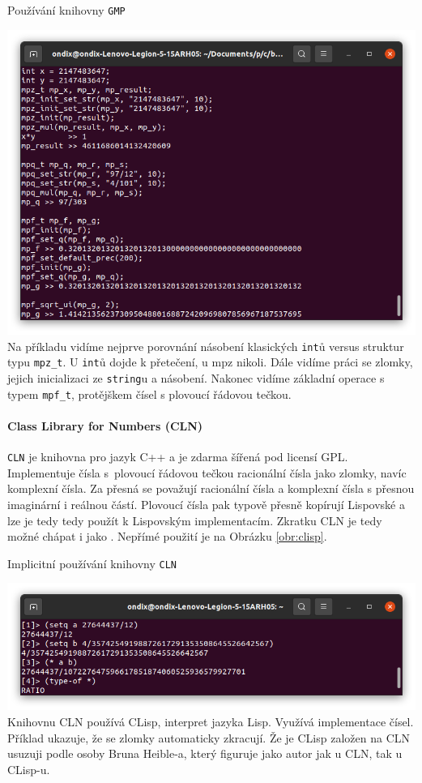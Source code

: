 \begin{myfigure}{}
\caption{Používání knihovny \texttt{GMP}}
\includegraphics[width=\linewidth]{./graphics/gmp.png}\label{obr:gmp}
Na příkladu vidíme nejprve porovnání násobení klasických \texttt{int}ů versus struktur typu \texttt{mpz\_t}. U \texttt{int}ů dojde k přetečení, u mpz nikoli. Dále vidíme práci se zlomky, jejich inicializaci ze \texttt{string}u a násobení. Nakonec vidíme základní operace s typem \texttt{mpf\_t}, protějškem čísel s plovoucí řádovou tečkou.
\end{myfigure}

\paragraph{Class Library for Numbers \cite{wiki:CLN} (CLN)} \texttt{CLN} je knihovna pro jazyk C++ a je zdarma šířená pod licensí GPL. Implementuje čísla s~plovoucí řádovou tečkou racionální čísla jako zlomky, navíc komplexní čísla. Za přesná se považují racionální čísla a komplexní čísla s přesnou imaginární i reálnou částí. Plovoucí čísla pak typově přesně kopírují Lispovské a lze je tedy tedy použít k Lispovským implementacím. Zkratku CLN je tedy možné chápat i jako . Nepřímé použití je na Obrázku \ref{obr:clisp}.
	
\begin{myfigure}{}
\caption{Implicitní používání knihovny \texttt{CLN}}
\includegraphics[width=\linewidth]{./graphics/clisp.png}\label{obr:clisp}
Knihovnu CLN používá CLisp, interpret jazyka Lisp. Využívá implementace čísel. Příklad ukazuje, že se zlomky automaticky zkracují. Že je CLisp založen na CLN usuzuji podle osoby Bruna Heible-a, který figuruje jako autor jak u CLN, tak u CLisp-u.
\end{myfigure}

